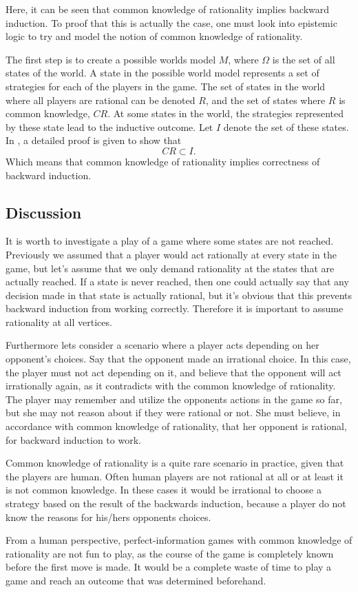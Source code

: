 Here, it can be seen that common knowledge of rationality implies backward induction. To proof that this is actually the case, one must look into epistemic logic to try and model the notion of common knowledge of rationality. 

The first step is to create a possible worlds model $M$, where $\Omega$ is the set of all states of the world. A state in the possible world model represents a set of strategies for each of the players in the game.
The set of states in the world where all players are rational can be denoted $R$, and the set of states where $R$ is common knowledge, $CR$. At some states in the world, the strategies represented by these state lead to the inductive outcome. Let $I$ denote the set of these states.
In \cite{aumann1995a}, a detailed proof is given to show that
$$
CR \subset I.
$$
Which means that common knowledge of rationality implies correctness of backward induction.

\subsection{Discussion}
It is worth to investigate a play of a game where some states are not reached. Previously we assumed that a player would act rationally at every state in the game, but let's assume that we only demand rationality at the states that are actually reached.
If a state is never reached, then one could actually say that any decision made in that state is actually rational, but it's obvious that this prevents backward induction from working correctly. Therefore it is important to assume rationality at all vertices.

Furthermore lets consider a scenario where a player acts depending on her opponent's choices. Say that the opponent made an irrational choice. In this case, the player must not act depending on it, and believe that the opponent will act irrationally again, as it contradicts with the common knowledge of rationality. The player may remember and utilize the opponents actions in the game so far, but she may not reason about if they were rational or not. She must believe, in accordance with common knowledge of rationality, that her opponent is rational, for backward induction to work.

Common knowledge of rationality is a quite rare scenario in practice, given that the players are human. Often human players are not rational at all or at least it is not common knowledge. In these cases it would be irrational to choose a strategy based on the result of the backwards induction, because a player do not know the reasons for his/hers opponents choices.

From a human perspective, perfect-information games with common knowledge of rationality are not fun to play, as the course of the game is completely known before the first move is made. It would be a complete waste of time to play a game and reach an outcome that was determined beforehand.
